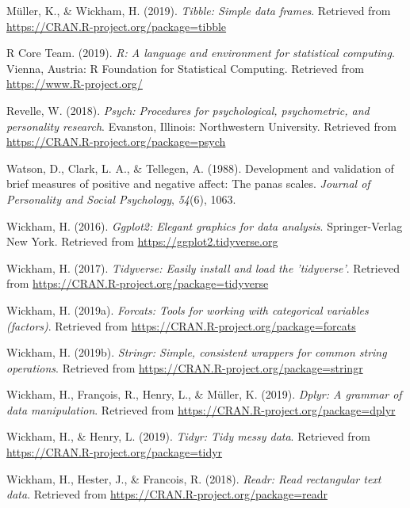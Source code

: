 \documentclass[man]{apa6}
\begin{document}
\leavevmode\hypertarget{ref-R-tibble}{}%
Müller, K., \& Wickham, H. (2019). \emph{Tibble: Simple data frames}. Retrieved from \url{https://CRAN.R-project.org/package=tibble}

\leavevmode\hypertarget{ref-R-base}{}%
R Core Team. (2019). \emph{R: A language and environment for statistical computing}. Vienna, Austria: R Foundation for Statistical Computing. Retrieved from \url{https://www.R-project.org/}

\leavevmode\hypertarget{ref-R-psych}{}%
Revelle, W. (2018). \emph{Psych: Procedures for psychological, psychometric, and personality research}. Evanston, Illinois: Northwestern University. Retrieved from \url{https://CRAN.R-project.org/package=psych}

\leavevmode\hypertarget{ref-watson1988development}{}%
Watson, D., Clark, L. A., \& Tellegen, A. (1988). Development and validation of brief measures of positive and negative affect: The panas scales. \emph{Journal of Personality and Social Psychology}, \emph{54}(6), 1063.

\leavevmode\hypertarget{ref-R-ggplot2}{}%
Wickham, H. (2016). \emph{Ggplot2: Elegant graphics for data analysis}. Springer-Verlag New York. Retrieved from \url{https://ggplot2.tidyverse.org}

\leavevmode\hypertarget{ref-R-tidyverse}{}%
Wickham, H. (2017). \emph{Tidyverse: Easily install and load the 'tidyverse'}. Retrieved from \url{https://CRAN.R-project.org/package=tidyverse}

\leavevmode\hypertarget{ref-R-forcats}{}%
Wickham, H. (2019a). \emph{Forcats: Tools for working with categorical variables (factors)}. Retrieved from \url{https://CRAN.R-project.org/package=forcats}

\leavevmode\hypertarget{ref-R-stringr}{}%
Wickham, H. (2019b). \emph{Stringr: Simple, consistent wrappers for common string operations}. Retrieved from \url{https://CRAN.R-project.org/package=stringr}

\leavevmode\hypertarget{ref-R-dplyr}{}%
Wickham, H., François, R., Henry, L., \& Müller, K. (2019). \emph{Dplyr: A grammar of data manipulation}. Retrieved from \url{https://CRAN.R-project.org/package=dplyr}

\leavevmode\hypertarget{ref-R-tidyr}{}%
Wickham, H., \& Henry, L. (2019). \emph{Tidyr: Tidy messy data}. Retrieved from \url{https://CRAN.R-project.org/package=tidyr}

\leavevmode\hypertarget{ref-R-readr}{}%
Wickham, H., Hester, J., \& Francois, R. (2018). \emph{Readr: Read rectangular text data}. Retrieved from \url{https://CRAN.R-project.org/package=readr}
\end{document}
